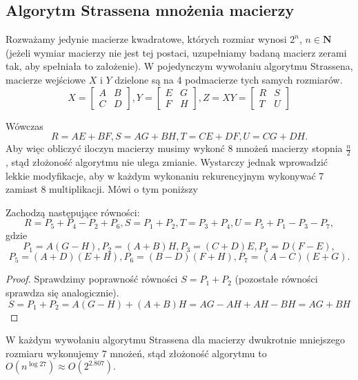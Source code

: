 \subsection{Algorytm Strassena mnożenia macierzy}
Rozważamy jedynie macierze kwadratowe, których rozmiar wynosi $2^n$, $n \in
\mathbf{N}$ (jeżeli wymiar macierzy nie jest tej postaci, uzupełniamy badaną
macierz zerami tak, aby spełniała to założenie). W pojedynczym wywołaniu
algorytmu Strassena, macierze wejściowe $X$ i $Y$ dzielone są na 4 podmacierze
tych samych rozmiarów.
$$X=\begin{bmatrix} A & B \\ C & D \end{bmatrix},	
Y=\begin{bmatrix} E & G \\ F & H \end{bmatrix},		
Z=XY=\begin{bmatrix} R & S \\ T & U \end{bmatrix}$$

Wówczas
$$ R=AE+BF, S=AG+BH, T=CE+DF, U=CG+DH.$$
Aby więc obliczyć iloczyn macierzy musimy wykonć 8 mnożeń macierzy stopnia
$\frac{n}{2}$, stąd złożoność algorytmu nie ulega zmianie. Wystarczy jednak
wprowadzić lekkie modyfikacje, aby  w każdym wykonaniu rekurencyjnym wykonywać
7 zamiast 8 multiplikacji. Mówi o tym poniższy
\begin{lm}{Zachodzą następujące równości:
$$R=P_5+P_4-P_2+P_6, S=P_1+P_2, T=P_3+P_4, U=P_5+P_1-P_3-P_7,$$
gdzie
$$P_1=A(G-H), P_2=(A+B)H, P_3=(C+D)E, P_4=D(F-E),$$
$$P_5=(A+D)(E+H), P_6=(B-D)(F+H), P_7 = (A-C)(E+G).$$}
\end{lm}
\begin{proof}
Sprawdzimy poprawność równości $S=P_1+P_2$ (pozostałe równości sprawdza się
analogicznie).
$$S=P_1+P_2=A(G-H)+(A+B)H=AG-AH+AH-BH=AG+BH$$
\end{proof}
W każdym wywołaniu algorytmu Strassena dla macierzy dwukrotnie mniejszego
rozmiaru wykonujemy 7 mnożeń, stąd złożoność algorytmu to $O(n^{\log{2}{7}})
\approx O(2^{2.807}).$

